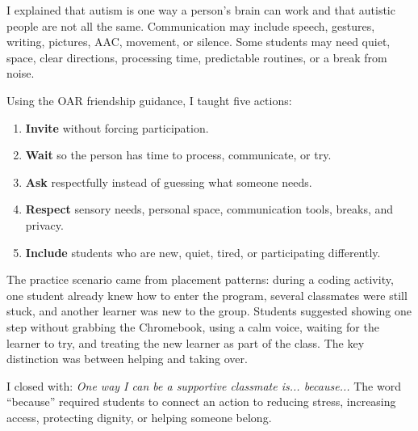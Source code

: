 
I explained that autism is one way a person's brain can work and that autistic people are not all the same. Communication may include speech, gestures, writing, pictures, AAC, movement, or silence. Some students may need quiet, space, clear directions, processing time, predictable routines, or a break from noise.

Using the OAR friendship guidance, I taught five actions:
\begin{enumerate}
\item \textbf{Invite} without forcing participation.
\item \textbf{Wait} so the person has time to process, communicate, or try.
\item \textbf{Ask} respectfully instead of guessing what someone needs.
\item \textbf{Respect} sensory needs, personal space, communication tools, breaks, and privacy.
\item \textbf{Include} students who are new, quiet, tired, or participating differently.
\end{enumerate}

The practice scenario came from placement patterns: during a coding activity, one student already knew how to enter the program, several classmates were still stuck, and another learner was new to the group. Students suggested showing one step without grabbing the Chromebook, using a calm voice, waiting for the learner to try, and treating the new learner as part of the class. The key distinction was between helping and taking over.

I closed with: \textit{One way I can be a supportive classmate is... because...} The word ``because'' required students to connect an action to reducing stress, increasing access, protecting dignity, or helping someone belong.